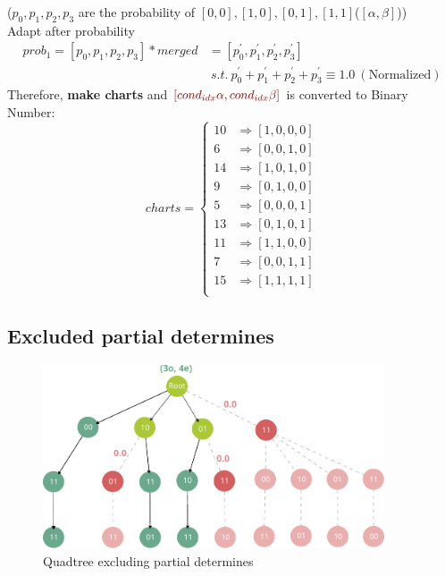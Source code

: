 ($p_0, p_1, p_2, p_3$ are the probability of $[0, 0], [1, 0], [0, 1], [1, 1]$($[\alpha, \beta]$))\\
Adapt after probability
\begin{equation}
    \begin{split}
        prob_1 =[p_0, p_1, p_2, p_3] * merged & = [p_0^{\prime}, p_1^{\prime}, p_2^{\prime}, p_3^{\prime}] \\
        & \ s.t.\ p_0^{\prime} + p_1^{\prime} + p_2^{\prime} + p_3^{\prime} \equiv 1.0 \ (\textrm{Normalized})
    \end{split}
\end{equation}
Therefore, \textbf{make charts} and $\textcolor{darkred}{[cond_{idx}\alpha, cond_{idx}\beta]}$
is converted to Binary Number:
\begin{equation}
    charts =
    \begin{cases}
        10 & \Rightarrow [1, 0, 0, 0] \\
        6 & \Rightarrow [0, 0, 1, 0] \\
        14 & \Rightarrow [1, 0, 1, 0] \\
        9 & \Rightarrow [0, 1, 0, 0] \\
        5 & \Rightarrow [0, 0, 0, 1] \\
        13 & \Rightarrow [0, 1, 0, 1] \\
        11 & \Rightarrow [1, 1, 0, 0] \\
        7 & \Rightarrow [0, 0, 1, 1] \\
        15 & \Rightarrow [1, 1, 1, 1] \\
    \end{cases}
\end{equation}

\subsection{Excluded partial determines}
\begin{figure}[htp]
    \includegraphics[width=0.90\textwidth]{../remove-det}
    \caption*{Quadtree excluding partial determines}
\end{figure}